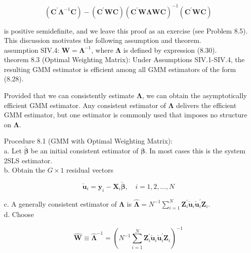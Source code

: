 \documentclass[10pt]{article}
\begin{document}
\begin{equation*}
\left(\mathbf{C}^{\prime} \mathbf{\Lambda}^{-1} \mathbf{C}\right)-\left(\mathbf{C}^{\prime} \mathbf{W C}\right)\left(\mathbf{C}^{\prime} \mathbf{W} \boldsymbol{\Lambda} \mathbf{W} \mathbf{C}\right)^{-1}\left(\mathbf{C}^{\prime} \mathbf{W} \mathbf{C}\right) \tag{8.34}
\end{equation*}


is positive semidefinite, and we leave this proof as an exercise (see Problem 8.5). This discussion motivates the following assumption and theorem.\\
assumption SIV.4: $\mathbf{W}=\boldsymbol{\Lambda}^{-1}$, where $\boldsymbol{\Lambda}$ is defined by expression (8.30).\\
theorem 8.3 (Optimal Weighting Matrix): Under Assumptions SIV.1-SIV.4, the resulting GMM estimator is efficient among all GMM estimators of the form (8.28).

Provided that we can consistently estimate $\boldsymbol{\Lambda}$, we can obtain the asymptotically efficient GMM estimator. Any consistent estimator of $\boldsymbol{\Lambda}$ delivers the efficient GMM estimator, but one estimator is commonly used that imposes no structure on $\boldsymbol{\Lambda}$.

Procedure 8.1 (GMM with Optimal Weighting Matrix):\\
a. Let $\check{\boldsymbol{\beta}}$ be an initial consistent estimator of $\boldsymbol{\beta}$. In most cases this is the system 2SLS estimator.\\
b. Obtain the $G \times 1$ residual vectors


\begin{equation*}
\check{\mathbf{u}}_{i}=\mathbf{y}_{i}-\mathbf{X}_{i} \check{\boldsymbol{\beta}}, \quad i=1,2, \ldots, N \tag{8.35}
\end{equation*}


c. A generally consistent estimator of $\boldsymbol{\Lambda}$ is $\hat{\boldsymbol{\Lambda}}=N^{-1} \sum_{i=1}^{N} \mathbf{Z}_{i}^{\prime} \check{\mathbf{u}}_{i} \check{\mathbf{u}}_{i}^{\prime} \mathbf{Z}_{i}$.\\
d. Choose


\begin{equation*}
\hat{\mathbf{W}} \equiv \hat{\boldsymbol{\Lambda}}^{-1}=\left(N^{-1} \sum_{i=1}^{N} \mathbf{Z}_{i}^{\prime} \check{\mathbf{u}}_{i} \check{\mathbf{u}}_{i}^{\prime} \mathbf{Z}_{i}\right)^{-1} \tag{8.36}
\end{equation*}
\end{document}
